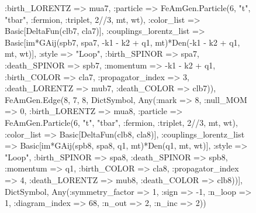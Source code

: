 \documentclass{revtex4}
\begin{document}
\begin{figure}[!htb]
\begin{center}
{:birth_LORENTZ => mua7, :particle => FeAmGen.Particle(6, "t", "tbar", :fermion, :triplet, 2//3, mt, wt), :color_list => Basic[DeltaFun(clb7, cla7)], :couplings_lorentz_list => Basic[im*GAij(spb7, spa7, -k1 - k2 + q1, mt)*Den(-k1 - k2 + q1, mt, wt)], :style => "Loop", :birth_SPINOR => spa7, :death_SPINOR => spb7, :momentum => -k1 - k2 + q1, :birth_COLOR => cla7, :propagator_index => 3, :death_LORENTZ => mub7, :death_COLOR => clb7)), FeAmGen.Edge(8, 7, 8, Dict{Symbol, Any}(:mark => 8, :null_MOM => 0, :birth_LORENTZ => mua8, :particle => FeAmGen.Particle(6, "t", "tbar", :fermion, :triplet, 2//3, mt, wt), :color_list => Basic[DeltaFun(clb8, cla8)], :couplings_lorentz_list => Basic[im*GAij(spb8, spa8, q1, mt)*Den(q1, mt, wt)], :style => "Loop", :birth_SPINOR => spa8, :death_SPINOR => spb8, :momentum => q1, :birth_COLOR => cla8, :propagator_index => 4, :death_LORENTZ => mub8, :death_COLOR => clb8))], Dict{Symbol, Any}(:symmetry_factor => 1, :sign => -1, :n_loop => 1, :diagram_index => 68, :n_out => 2, :n_inc => 2)) 
}
\end{center}
\end{figure}
\end{document}
